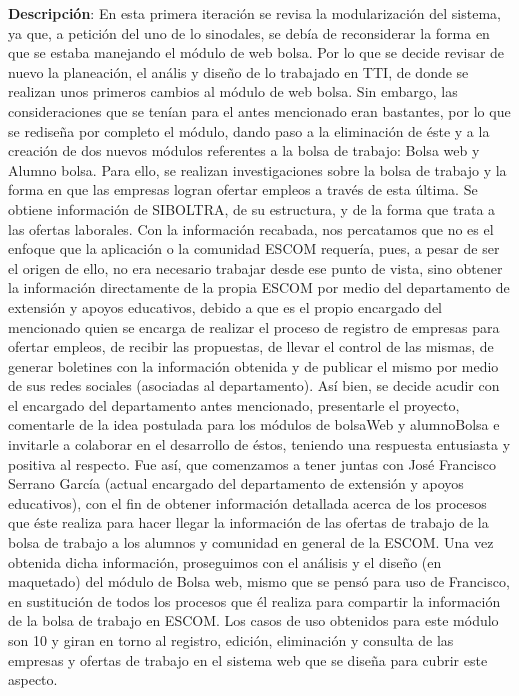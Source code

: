 \noindent
\textbf{Descripción}: En esta primera iteración se revisa la modularización del sistema, ya que, a petición del uno de lo sinodales, se debía de reconsiderar la forma en que se estaba manejando el módulo de web bolsa. Por lo que se decide revisar de nuevo la planeación, el anális y diseño de lo trabajado en TTI, de donde se realizan unos primeros cambios al módulo de web bolsa. Sin embargo, las consideraciones que se tenían para el antes mencionado eran bastantes, por lo que se rediseña por completo el módulo, dando paso a la eliminación de éste y a la creación de dos nuevos módulos referentes a la bolsa de trabajo: Bolsa web y Alumno bolsa. 
\newline
\newline
Para ello, se realizan investigaciones sobre la bolsa de trabajo y la forma en que las empresas logran ofertar empleos a través de esta última. Se obtiene información de SIBOLTRA, de su estructura, y de la forma que trata a las ofertas laborales. Con la información recabada, nos percatamos que no es el enfoque que la aplicación o la comunidad ESCOM requería, pues, a pesar de ser el origen de ello, no era necesario trabajar desde ese punto de vista, sino obtener la información directamente de la propia ESCOM por medio del departamento de extensión y apoyos educativos, debido a que es el propio encargado del mencionado quien se encarga de realizar el proceso de registro de empresas para ofertar empleos, de recibir las propuestas, de llevar el control de las mismas, de generar boletines con la información obtenida y de publicar el mismo por medio de sus redes sociales (asociadas al departamento). Así bien, se decide acudir con el encargado del departamento antes mencionado, presentarle el proyecto, comentarle de la idea postulada para los módulos de bolsaWeb y alumnoBolsa e invitarle a colaborar en el desarrollo de éstos, teniendo una respuesta entusiasta y positiva al respecto. 
\newline
\newline
Fue así, que comenzamos a tener juntas con José Francisco Serrano García (actual encargado del departamento de extensión y apoyos educativos), con el fin de obtener información detallada acerca de los procesos que éste realiza para hacer llegar la información de las ofertas de trabajo de la bolsa de trabajo a los alumnos y comunidad en general de la ESCOM. Una vez obtenida dicha información, proseguimos con el análisis y el diseño (en maquetado) del módulo de Bolsa web, mismo que se pensó para uso de Francisco, en sustitución de todos los procesos que él realiza para compartir la información de la bolsa de trabajo en ESCOM. Los casos de uso obtenidos para este módulo son 10 y giran en torno al registro, edición, eliminación y consulta de las empresas y ofertas de trabajo en el sistema web que se diseña para cubrir este aspecto. 
